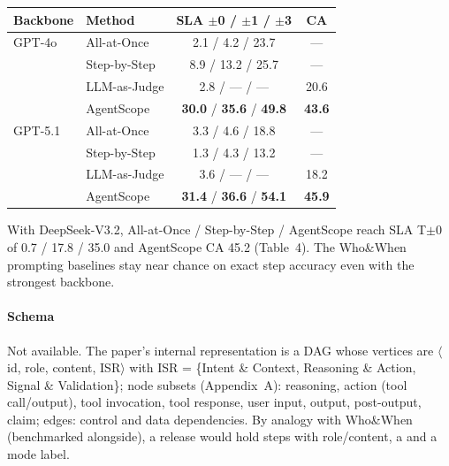 \begin{center}\small
\begin{tabular}{@{}llcc@{}}\toprule
Backbone & Method & SLA $\pm$0 / $\pm$1 / $\pm$3 & CA\\\midrule
GPT-4o & All-at-Once & 2.1 / 4.2 / 23.7 & ---\\
 & Step-by-Step & 8.9 / 13.2 / 25.7 & ---\\
 & LLM-as-Judge & 2.8 / --- / --- & 20.6\\
 & AgentScope & \textbf{30.0} / \textbf{35.6} / \textbf{49.8} & \textbf{43.6}\\
GPT-5.1 & All-at-Once & 3.3 / 4.6 / 18.8 & ---\\
 & Step-by-Step & 1.3 / 4.3 / 13.2 & ---\\
 & LLM-as-Judge & 3.6 / --- / --- & 18.2\\
 & AgentScope & \textbf{31.4} / \textbf{36.6} / \textbf{54.1} & \textbf{45.9}\\\bottomrule
\end{tabular}
\end{center}
With DeepSeek-V3.2, All-at-Once / Step-by-Step / AgentScope reach SLA T$\pm$0 of 0.7 / 17.8 / 35.0 and AgentScope CA 45.2 (Table~4). The Who\&When prompting baselines stay near chance on exact step accuracy even with the strongest backbone.

\paragraph{Schema} Not available. The paper's internal representation is a DAG whose vertices are $\langle$id, role, content, ISR$\rangle$ with ISR = \{Intent \& Context, Reasoning \& Action, Signal \& Validation\}; node subsets (Appendix~A): reasoning, action (tool call/output), tool invocation, tool response, user input, output, post-output, claim; edges: control and data dependencies. By analogy with Who\&When (benchmarked alongside), a release would hold steps with role/content, a  and a mode label.

